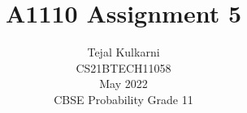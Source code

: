 \documentclass[journal,12pt,two column]{IEEEtran}
\title{A1110 Assignment 5 }
\author{Tejal Kulkarni \\ CS21BTECH11058 \\\vspace*{20pt} May 2022 \\ CBSE Probability Grade 11 }
\begin{document}
\newcommand{\solution}{\noindent \textbf{Solution: }}
\providecommand{\pr}[1]{\ensuremath{\Pr\left(#1\right)}}
\providecommand{\qfunc}[1]{\ensuremath{Q\left(#1\right)}}
\providecommand{\sbrak}[1]{\ensuremath{{}\left[#1\right]}}
\providecommand{\lsbrak}[1]{\ensuremath{{}\left[#1\right.}}
\providecommand{\rsbrak}[1]{\ensuremath{{}\left.#1\right]}}
\providecommand{\brak}[1]{\ensuremath{\left(#1\right)}}
\providecommand{\lbrak}[1]{\ensuremath{\left(#1\right.}}
\providecommand{\rbrak}[1]{\ensuremath{\left.#1\right)}}
\providecommand{\cbrak}[1]{\ensuremath{\left\{#1\right\}}}
\providecommand{\lcbrak}[1]{\ensuremath{\left\{#1\right.}}
\providecommand{\rcbrak}[1]{\ensuremath{\left.#1\right\}}}
\newcommand*{\permcomb}[4][0mu]{{{}^{#3}\mkern#1#2_{#4}}}
\newcommand*{\perm}[1][-3mu]{\permcomb[#1]{P}}
\newcommand*{\comb}[1][-1mu]{\permcomb[#1]{C}}
\renewcommand{\thetable}{\arabic{table}} 

\maketitle
\end{document}
